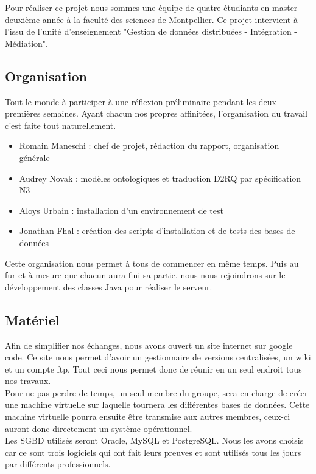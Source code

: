 \documentclass[12pt]{article}
\begin{document}
	Pour réaliser ce projet nous sommes une équipe de quatre étudiants en master deuxième année à la faculté des sciences de Montpellier. Ce projet intervient à l'issu de l'unité d'enseignement "Gestion de données distribuées - Intégration - Médiation".

\subsection{Organisation}

	Tout le monde à participer à une réflexion préliminaire pendant les deux premières semaines.
	Ayant chacun nos propres affinitées, l'organisation du travail c'est faite tout naturellement.\\
	\begin{itemize}
		\item Romain Maneschi : chef de projet, rédaction du rapport, organisation générale\\
		\item Audrey Novak : modèles ontologiques et traduction D2RQ par spécification N3\\
		\item Aloys Urbain : installation d'un environnement de test\\
		\item Jonathan Fhal : création des scripts d'installation et de tests des bases de données\\
	\end{itemize}
	
	Cette organisation nous permet à tous de commencer en même temps. Puis au fur et à mesure que chacun aura fini sa partie, nous nous rejoindrons sur le développement des classes Java pour réaliser le serveur.

\subsection{Matériel}

	Afin de simplifier nos échanges, nous avons ouvert un site internet sur google code. Ce site nous permet d'avoir un gestionnaire de versions centralisées, un wiki et un compte ftp. Tout ceci nous permet donc de réunir en un seul endroit tous nos travaux.\\
	\indent Pour ne pas perdre de temps, un seul membre du groupe, sera en charge de créer une machine virtuelle sur laquelle tournera les différentes bases de données. Cette machine virtuelle pourra ensuite être transmise aux autres membres, ceux-ci auront donc directement un système opérationnel.\\
	\indent Les SGBD utilisés seront Oracle, MySQL et PostgreSQL. Nous les avons choisis car ce sont trois logiciels qui ont fait leurs preuves et sont utilisés tous les jours par différents professionnels. 
	
\end{document}
